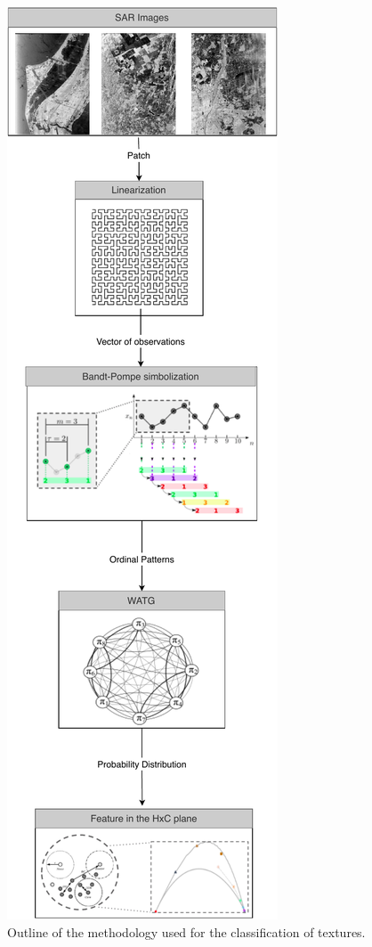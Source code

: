 \documentclass[journal]{IEEEtran}
\begin{document}
\begin{figure}
	\centering
	\includegraphics[width=.7\columnwidth]{Figures/methodology.pdf}
	\caption{Outline of the methodology used for the classification of textures.}
	\label{fig:WATG}
\end{figure}
\end{document}
